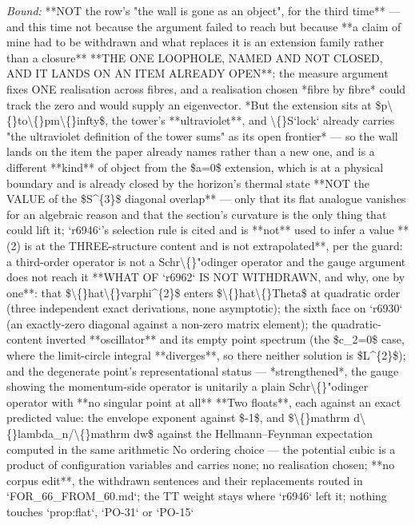 \begin{description}
 \emph{Bound:}  **NOT the row's "the wall is gone as an object", for the third time** --- and this time not because the argument failed to reach but because **a claim of mine had to be withdrawn and what replaces it is an extension family rather than a closure**  **THE ONE LOOPHOLE, NAMED AND NOT CLOSED, AND IT LANDS ON AN ITEM ALREADY OPEN**: the measure argument fixes ONE realisation across fibres, and a realisation chosen *fibre by fibre* could track the zero and would supply an eigenvector. *But the extension sits at \$p\textbackslash\{\}to\textbackslash\{\}pm\textbackslash\{\}infty\$, the tower's **ultraviolet**, and \textbackslash\{\}S`lock` already carries "the ultraviolet definition of the tower sums" as its open frontier* --- so the wall lands on the item the paper already names rather than a new one, and is a different **kind** of object from the \$a=0\$ extension, which is at a physical boundary and is already closed by the horizon's thermal state  **NOT the VALUE of the \$S\textasciicircum{}\{3\}\$ diagonal overlap** --- only that its flat analogue vanishes for an algebraic reason and that the section's curvature is the only thing that could lift it; `r6946`'s selection rule is cited and is **not** used to infer a value  **(2) is at the THREE-structure content and is not extrapolated**, per the guard: a third-order operator is not a Schr\textbackslash\{\}"odinger operator and the gauge argument does not reach it  **WHAT OF `r6962` IS NOT WITHDRAWN, and why, one by one**: that \$\textbackslash\{\}hat\textbackslash\{\}varphi\textasciicircum{}\{2\}\$ enters \$\textbackslash\{\}hat\textbackslash\{\}Theta\$ at quadratic order (three independent exact derivations, none asymptotic); the sixth face on `r6930` (an exactly-zero diagonal against a non-zero matrix element); the quadratic-content inverted **oscillator** and its empty point spectrum (the \$c\_2=0\$ case, where the limit-circle integral **diverges**, so there neither solution is \$L\textasciicircum{}\{2\}\$); and the degenerate point's representational status --- *strengthened*, the gauge showing the momentum-side operator is unitarily a plain Schr\textbackslash\{\}"odinger operator with **no singular point at all**  **Two floats**, each against an exact predicted value: the envelope exponent against \$-1\$, and \$\textbackslash\{\}mathrm d\textbackslash\{\}lambda\_n/\textbackslash\{\}mathrm dw\$ against the Hellmann--Feynman expectation computed in the same arithmetic  No ordering choice --- the potential cubic is a product of configuration variables and carries none; no realisation chosen; **no corpus edit**, the withdrawn sentences and their replacements routed in `FOR\_66\_FROM\_60.md`; the TT weight stays where `r6946` left it; nothing touches `prop:flat`, `PO-31` or `PO-15`

\end{description}
